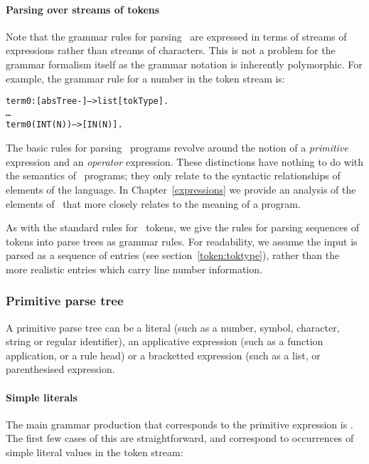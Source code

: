 \paragraph{Parsing over streams of tokens}
Note that the grammar rules for parsing \go\ are expressed in terms of streams of  expressions rather than streams of characters. This is not a problem for the grammar formalism itself as the grammar notation is inherently polymorphic. For example, the grammar rule for a number in the token stream is:
\begin{alltt}
term0:[absTree-]-->list[tokType].
\ldots
term0(INT(N)) --> [IN(N)].
\end{alltt}
The basic rules for parsing \go\ programs revolve around the notion of a {\em primitive} expression and an {\em operator} expression. These distinctions have nothing to do with the semantics of \go\ programs; they only relate to the syntactic relationships of elements of the language. In  Chapter~\ref{expressions} we provide an analysis of the elements of \go\ that more closely relates to the meaning of a program.
     
As with the standard rules for \go\ tokens, we give the rules for parsing sequences of tokens into parse trees as \go grammar rules. For readability, we  assume the input is parsed as a sequence of  entries (see section~\vref{token:toktype}), rather than the more realistic  entries which carry line number information.

\subsubsection{Primitive parse tree}
\label{grammar:primitive}
A primitive parse tree can be a literal (such as a number, symbol, character, string or regular identifier), an applicative expression (such as a function application, or a rule head) or a bracketted expression (such as a list, or parenthesised expression.

\paragraph{Simple literals}
The main grammar production that corresponds to the primitive expression is . The first few cases of this are straightforward, and correspond to occurrences of simple literal values in the token stream:

